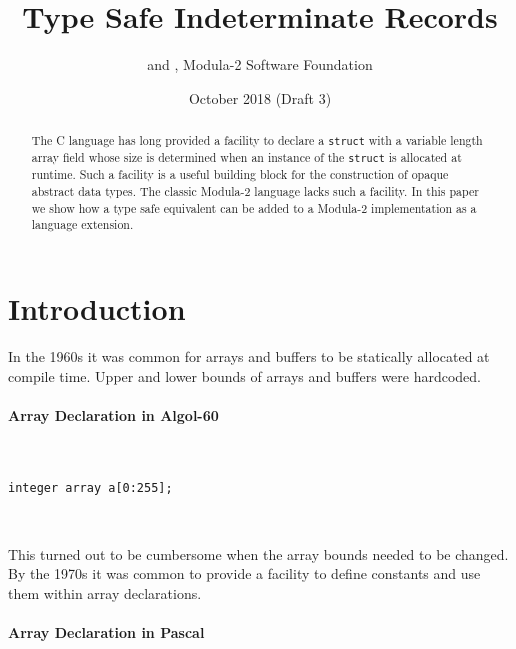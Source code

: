 \documentclass[10pt,a4paper]{article}
\title{Type Safe Indeterminate Records}
\author{\BK\hspace{0pt} and \RS, Modula-2 Software Foundation}
\date{\small{October 2018 (Draft 3)}}
\makeatletter
\newcommand{\verbatimfont}[1]{\def\verbatim@font{#1}}
\newcommand\sourcecaption[1]{\noindent\normalfont\small\textsf{#1}}
\makeatother
\begin{document}
\verbatimfont{\small\fontfamily{lmtt}\selectfont}
\maketitle

\begin{abstract}
The C language has long provided a facility to declare a \verb|struct| with
a variable length array field whose size is determined when an instance
of the \verb|struct| is allocated at runtime. Such a facility is a useful
building block for the construction of opaque abstract data types. The classic
Modula-2 language \cite{Wirth88, ISO96} lacks such a facility. In this paper we
show how a type safe equivalent can be added to a Modula-2 implementation as a
language extension.
\end{abstract}


\section{Introduction}

In the 1960s it was common for arrays and buffers to be statically allocated
at compile time. Upper and lower bounds of arrays and buffers were hardcoded.

\paragraph{\sourcecaption{Array Declaration in Algol-60 \cite{Backus60}}}~

\lstset{style=algol}
\begin{lstlisting}
integer array a[0:255];
\end{lstlisting}~

\noindent This turned out to be cumbersome when the array bounds needed to
be changed. By the 1970s it was common to provide a facility to define
constants and use them within array declarations.

\paragraph{\sourcecaption{Array Declaration in Pascal \cite{JW74}}}~
\end{document}
